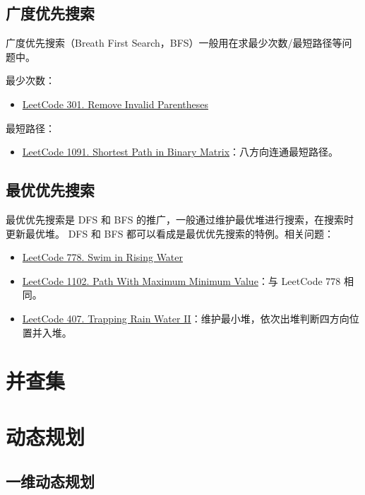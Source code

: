 \subsection{广度优先搜索}
广度优先搜索（Breath First Search，BFS）一般用在求最少次数/最短路径等问题中。

最少次数：
\begin{itemize}
  \item
    \href{https://leetcode.com/problems/remove-invalid-parentheses/}{LeetCode 301. Remove Invalid Parentheses}
\end{itemize}

最短路径：
\begin{itemize}
  \item
    \href{https://leetcode.com/problems/shortest-path-in-binary-matrix/}{LeetCode
      1091. Shortest Path in Binary Matrix}：八方向连通最短路径。
\end{itemize}

\subsection{最优优先搜索}
最优优先搜索是 DFS 和 BFS 的推广，一般通过维护最优堆进行搜索，在搜索时更新最优堆。
DFS 和 BFS 都可以看成是最优优先搜索的特例。相关问题：

\begin{itemize}
  \item
    \href{https://leetcode.com/problems/swim-in-rising-water/}{LeetCode 778. Swim in Rising Water}
  \item
    \href{https://leetcode.com/problems/path-with-maximum-minimum-value}{LeetCode
      1102. Path With Maximum Minimum Value}：与 LeetCode 778 相同。
  \item
    \href{https://leetcode.com/problems/trapping-rain-water-ii/}{LeetCode 407.
      Trapping Rain Water II}：维护最小堆，依次出堆判断四方向位置并入堆。
\end{itemize}


\section{并查集}

\section{动态规划}

\subsection{一维动态规划}

